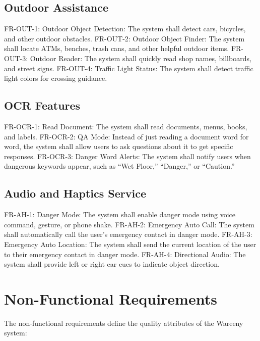 \documentclass[12pt,a4paper]{report}
\begin{document}
\subsection{Outdoor Assistance}

FR-OUT-1: Outdoor Object Detection: The system shall detect cars, bicycles, and other outdoor obstacles. FR-OUT-2: Outdoor Object Finder: The system shall locate ATMs, benches, trash cans, and other helpful outdoor items. FR-OUT-3: Outdoor Reader: The system shall quickly read shop names, billboards, and street signs. FR-OUT-4: Traffic Light Status: The system shall detect traffic light colors for crossing guidance.

\subsection{OCR Features}

FR-OCR-1: Read Document: The system shall read documents, menus, books, and labels. FR-OCR-2: QA Mode: Instead of just reading a document word for word, the system shall allow users to ask questions about it to get specific responses. FR-OCR-3: Danger Word Alerts: The system shall notify users when dangerous keywords appear, such as ``Wet Floor,'' ``Danger,'' or ``Caution.''

\subsection{Audio and Haptics Service}

FR-AH-1: Danger Mode: The system shall enable danger mode using voice command, gesture, or phone shake. FR-AH-2: Emergency Auto Call: The system shall automatically call the user's emergency contact in danger mode. FR-AH-3: Emergency Auto Location: The system shall send the current location of the user to their emergency contact in danger mode. FR-AH-4: Directional Audio: The system shall provide left or right ear cues to indicate object direction.

\section{Non-Functional Requirements}

The non-functional requirements define the quality attributes of the Wareeny system:
\end{document}
